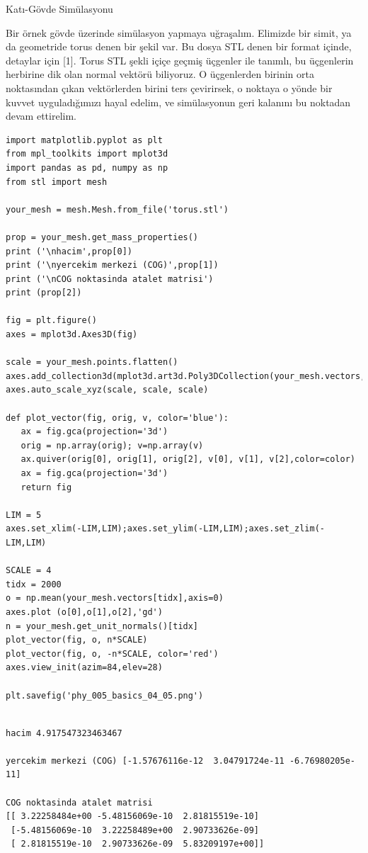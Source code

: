 \documentclass[12pt,fleqn]{article}\usepackage{../../common}
\begin{document}
Katı-Gövde Simülasyonu

Bir örnek gövde üzerinde simülasyon yapmaya uğraşalım. Elimizde bir simit, ya da
geometride torus denen bir şekil var. Bu dosya STL denen bir format içinde,
detaylar için [1]. Torus STL şekli içiçe geçmiş üçgenler ile tanımlı, bu
üçgenlerin herbirine dik olan normal vektörü biliyoruz. O üçgenlerden birinin
orta noktasından çıkan vektörlerden birini ters çevirirsek, o noktaya o yönde
bir kuvvet uyguladığımızı hayal edelim, ve simülasyonun geri kalanını bu
noktadan devam ettirelim.

\begin{verbatim}
import matplotlib.pyplot as plt
from mpl_toolkits import mplot3d
import pandas as pd, numpy as np
from stl import mesh

your_mesh = mesh.Mesh.from_file('torus.stl')

prop = your_mesh.get_mass_properties()
print ('\nhacim',prop[0])
print ('\nyercekim merkezi (COG)',prop[1])
print ('\nCOG noktasinda atalet matrisi')
print (prop[2])

fig = plt.figure()
axes = mplot3d.Axes3D(fig)

scale = your_mesh.points.flatten()
axes.add_collection3d(mplot3d.art3d.Poly3DCollection(your_mesh.vectors,alpha=0.3))
axes.auto_scale_xyz(scale, scale, scale)

def plot_vector(fig, orig, v, color='blue'):
   ax = fig.gca(projection='3d')
   orig = np.array(orig); v=np.array(v)
   ax.quiver(orig[0], orig[1], orig[2], v[0], v[1], v[2],color=color)
   ax = fig.gca(projection='3d')  
   return fig

LIM = 5
axes.set_xlim(-LIM,LIM);axes.set_ylim(-LIM,LIM);axes.set_zlim(-LIM,LIM)

SCALE = 4
tidx = 2000
o = np.mean(your_mesh.vectors[tidx],axis=0)
axes.plot (o[0],o[1],o[2],'gd')
n = your_mesh.get_unit_normals()[tidx]
plot_vector(fig, o, n*SCALE)
plot_vector(fig, o, -n*SCALE, color='red')
axes.view_init(azim=84,elev=28)

plt.savefig('phy_005_basics_04_05.png')
\end{verbatim}

\begin{verbatim}

hacim 4.917547323463467

yercekim merkezi (COG) [-1.57676116e-12  3.04791724e-11 -6.76980205e-11]

COG noktasinda atalet matrisi
[[ 3.22258484e+00 -5.48156069e-10  2.81815519e-10]
 [-5.48156069e-10  3.22258489e+00  2.90733626e-09]
 [ 2.81815519e-10  2.90733626e-09  5.83209197e+00]]
\end{verbatim}
\end{document}
